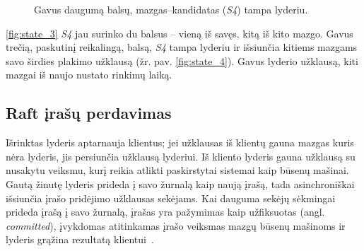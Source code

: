 \documentclass{VUMIFPSkursinis}
\begin{document}
\begin{figure}[H]
\centering
    \hfill
    
    \caption{Gavus daugumą balsų, mazgas--kandidatas (\textit{S4}) tampa lyderiu.}

\end{figure}

\ref{fig:state_3} \textit{S4} jau surinko du balsus -- vieną iš savęs, kitą iš kito mazgo. Gavus trečią, paskutinį reikalingą, balsą, \textit{S4} tampa lyderiu ir išsiunčia kitiems mazgams savo širdies plakimo užklausą (žr. pav. \ref{fig:state_4}). Gavus lyderio užklausą, kiti mazgai iš naujo nustato rinkimų laiką. 

\subsection{Raft įrašų perdavimas}

Išrinktas lyderis aptarnauja klientus; jei užklausas iš klientų gauna mazgas kuris nėra lyderis, jis persiunčia užklausą lyderiui. Iš kliento lyderis gauna užklausą su nusakytu veiksmu, kurį reikia atlikti paskirstytai sistemai kaip būsenų mašinai. Gautą žinutę lyderis prideda į savo žurnalą kaip naują įrašą, tada asinchroniškai išsiunčia įrašo pridėjimo užklausas sekėjams. Kai dauguma sekėjų sėkmingai prideda įrašą į savo žurnalą, įrašas yra pažymimas kaip užfiksuotas (angl. \textit{committed}), įvykdomas atitinkamas įrašo veiksmas mazgų būsenų mašinoms ir lyderis grąžina rezultatą klientui~\cite{ongaro_consensus}. 
\end{document}
